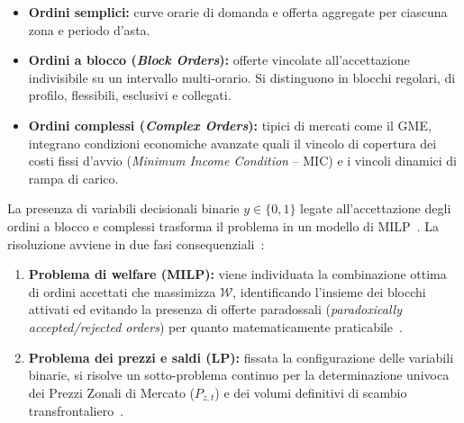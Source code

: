 \begin{itemize}
    \item \textbf{Ordini semplici:} curve orarie di domanda e offerta aggregate per ciascuna zona e periodo d'asta.
    \item \textbf{Ordini a blocco (\textit{Block Orders}):} offerte vincolate all'accettazione indivisibile su un intervallo multi-orario. Si distinguono in blocchi regolari, di profilo, flessibili, esclusivi e collegati.
    \item \textbf{Ordini complessi (\textit{Complex Orders}):} tipici di mercati come il \ac{GME}, integrano condizioni economiche avanzate quali il vincolo di copertura dei costi fissi d'avvio (\textit{Minimum Income Condition} -- MIC) e i vincoli dinamici di rampa di carico.
\end{itemize}

La presenza di variabili decisionali binarie $y \in \{0, 1\}$ legate all'accettazione degli ordini a blocco e complessi trasforma il problema in un modello di \ac{MILP}~\cite{alberizzi_rse_2025}. La risoluzione avviene in due fasi consequenziali~\cite{nemo_euphemia}:
\begin{enumerate}
    \item \textbf{Problema di welfare (\ac{MILP}):} viene individuata la combinazione ottima di ordini accettati che massimizza $\mathcal{W}$, identificando l'insieme dei blocchi attivati ed evitando la presenza di offerte paradossali (\textit{paradoxically accepted/rejected orders}) per quanto matematicamente praticabile~\cite{alberizzi_rse_2025}.
    \item \textbf{Problema dei prezzi e saldi (LP):} fissata la configurazione delle variabili binarie, si risolve un sotto-problema continuo per la determinazione univoca dei Prezzi Zonali di Mercato ($P_{z,t}$) e dei volumi definitivi di scambio transfrontaliero~\cite{alberizzi_rse_2025}.
\end{enumerate}







